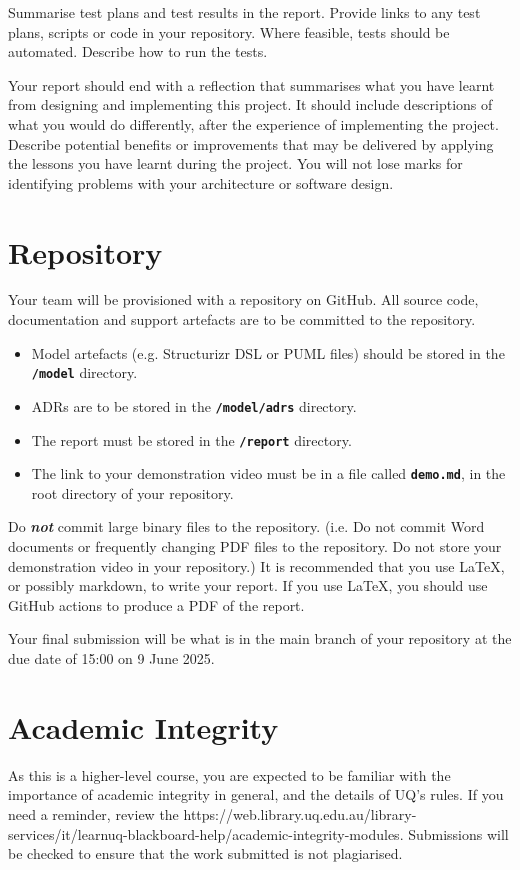 \documentclass{csse4400}
\begin{document}
Summarise test plans and test results in the report.
Provide links to any test plans, scripts or code in your repository.
Where feasible, tests should be automated.
Describe how to run the tests.

Your report should end with a reflection that summarises what you have learnt from designing and implementing this project.
It should include descriptions of what you would do differently, after the experience of implementing the project.
Describe potential benefits or improvements that may be delivered by applying the lessons you have learnt during the project.
You will not lose marks for identifying problems with your architecture or software design.


\section{Repository}
Your team will be provisioned with a repository on GitHub.
All source code, documentation and support artefacts are to be committed to the repository.

\begin{itemize}[itemsep=3pt,parsep=3pt]
    \item Model artefacts (e.g. Structurizr DSL or PUML files) should be stored in the \textbf{\texttt{/model}} directory.
    \item ADRs are to be stored in the \textbf{\texttt{/model/adrs}} directory.
    \item The report must be stored in the \textbf{\texttt{/report}} directory.
    \item The link to your demonstration video must be in a file called \textbf{\texttt{demo.md}}, in the root directory of your repository.
\end{itemize}

Do \textbf{\emph{not}} commit large binary files to the repository.
(i.e. Do not commit Word documents or frequently changing PDF files to the repository.
Do not store your demonstration video in your repository.)
It is recommended that you use LaTeX, or possibly markdown, to write your report.
If you use LaTeX, you should use GitHub actions to produce a PDF of the report.

Your final submission will be what is in the main branch of your repository at the due date of 15:00 on 9 June 2025.


\section{Academic Integrity}
As this is a higher-level course, you are expected to be familiar with the importance of academic integrity in general, and the details of UQ's rules.
If you need a reminder, review the 
{https://web.library.uq.edu.au/library-services/it/learnuq-blackboard-help/academic-integrity-modules}.
Submissions will be checked to ensure that the work submitted is not plagiarised.
\end{document}
